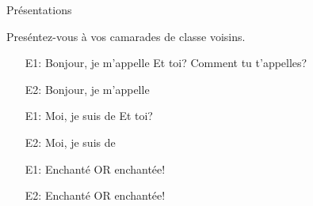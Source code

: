 \begin{frame}{Présentations}
  \begin{center}
    Preséntez-vous à vos camarades de classe voisins.\\
  \end{center}
  \begin{itemize}
    \item[E1:] Bonjour, je m'appelle \underline{\hspace{2cm}} Et toi? Comment tu t'appelles?
    \item[E2:] Bonjour, je m'appelle \underline{\hspace{2cm}}
    \item[E1:] Moi, je suis de \underline{\hspace{2cm}} Et toi?
    \item[E2:] Moi, je suis de \underline{\hspace{2cm}}
    \item[E1:] Enchanté OR enchantée!
    \item[E2:] Enchanté OR enchantée!
  \end{itemize}
\end{frame}